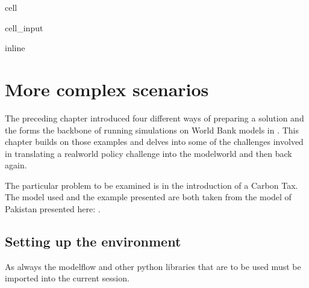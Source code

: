 \documentclass[letterpaper,10pt,english]{jupyterBook}
\begin{document}
\begin{sphinxuseclass}{cell}\begin{sphinxVerbatimInput}

\begin{sphinxuseclass}{cell_input}
\begin{sphinxVerbatim}[commandchars=\\\{\}]
 inline
\end{sphinxVerbatim}

\end{sphinxuseclass}\end{sphinxVerbatimInput}

\end{sphinxuseclass}

\chapter{More complex scenarios}
\label{\detokenize{content/05_WBModels/MoreComplexScenarios:more-complex-scenarios}}\label{\detokenize{content/05_WBModels/MoreComplexScenarios::doc}}
\sphinxAtStartPar
The preceding chapter introduced four different ways of preparing a solution and the forms the backbone of running simulations on World Bank models in . This chapter builds on those examples and delves into some of the challenges involved in translating a real\sphinxhyphen{}world policy challenge into the model\sphinxhyphen{}world and then back again.

\sphinxAtStartPar
The particular problem to be examined is in the introduction of a Carbon Tax. The model used and the example presented are both taken from the model of Pakistan presented here: .


\section{Setting up the environment}
\label{\detokenize{content/05_WBModels/MoreComplexScenarios:setting-up-the-environment}}
\sphinxAtStartPar
As always the modelflow and other python libraries that are to be used must be imported into the current session.
\end{document}
